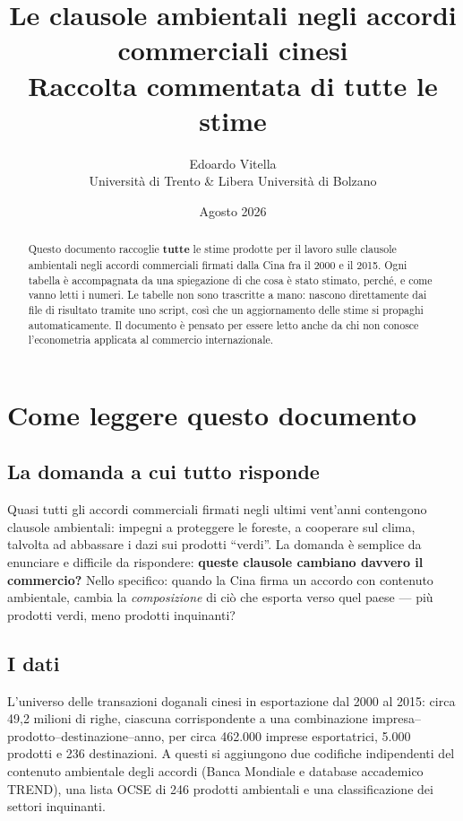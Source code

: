 \documentclass[11pt,a4paper]{article}
\title{\textbf{Le clausole ambientali negli accordi commerciali cinesi}\\[4pt]
\large Raccolta commentata di tutte le stime}
\author{Edoardo Vitella\\ \small Universit\`a di Trento \& Libera Universit\`a di Bolzano}
\date{Agosto 2026}
\begin{document}
\maketitle

\begin{abstract}
\noindent Questo documento raccoglie \textbf{tutte} le stime prodotte per il lavoro sulle
clausole ambientali negli accordi commerciali firmati dalla Cina fra il 2000 e il 2015.
Ogni tabella \`e accompagnata da una spiegazione di che cosa \`e stato stimato, perch\'e,
e come vanno letti i numeri. Le tabelle non sono trascritte a mano: nascono direttamente
dai file di risultato tramite uno script, cos\`i che un aggiornamento delle stime si
propaghi automaticamente. Il documento \`e pensato per essere letto anche da chi non
conosce l'econometria applicata al commercio internazionale.
\end{abstract}

\tableofcontents
\newpage

\section{Come leggere questo documento}

\subsection*{La domanda a cui tutto risponde}

Quasi tutti gli accordi commerciali firmati negli ultimi vent'anni contengono clausole
ambientali: impegni a proteggere le foreste, a cooperare sul clima, talvolta ad abbassare
i dazi sui prodotti ``verdi''. La domanda \`e semplice da enunciare e difficile da
rispondere: \textbf{queste clausole cambiano davvero il commercio?} Nello specifico:
quando la Cina firma un accordo con contenuto ambientale, cambia la \emph{composizione}
di ci\`o che esporta verso quel paese --- pi\`u prodotti verdi, meno prodotti inquinanti?

\subsection*{I dati}

L'universo delle transazioni doganali cinesi in esportazione dal 2000 al 2015: circa
49,2 milioni di righe, ciascuna corrispondente a una combinazione impresa--prodotto--desti\-nazione--anno,
per circa 462.000 imprese esportatrici, 5.000 prodotti e 236 destinazioni. A questi si
aggiungono due codifiche indipendenti del contenuto ambientale degli accordi (Banca Mondiale
e database accademico TREND), una lista OCSE di 246 prodotti ambientali e una classificazione
dei settori inquinanti.
\end{document}
